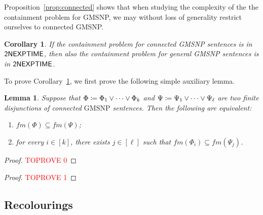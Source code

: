 \documentclass[oneside,reqno,12pt]{amsart}
\theoremstyle{plain}
\newtheorem{lemma}[thm]{Lemma}
\newtheorem{corollary}[thm]{Corollary}
\theoremstyle{remark}
\renewcommand{\coloneqq}{\mathrel{\mathop:}\mathrel{\mkern-1.2mu}=}
\newcommand{\fm}{\ensuremath{\mathit{fm}}\xspace}
\newcommand{\GMSNP}{\ensuremath{\mathrm{GMSNP}}\xspace}
\newcommand{\TWONEXPTIME}{{\textup{\textsf{2NEXPTIME}}}\xspace}
\begin{document}
{Proposition~\ref{prop:connected} shows that when studying the complexity of the the containment problem for GMSNP,   we may without loss of generality restrict ourselves to connected GMSNP.  


\begin{corollary}\label{cor:connected_matters_not}
    If the containment problem for connected GMSNP sentences is in $\TWONEXPTIME$, then also the containment problem for general GMSNP sentences is in $\TWONEXPTIME$.
\end{corollary}


To prove Corollary~\ref{cor:connected_matters_not}, we first prove the following simple auxiliary lemma.

\begin{lemma}\label{lem:connected}
 Suppose that $\Phi\coloneqq\Phi_1\vee\dots\vee\Phi_k$ and $\Psi\coloneqq\Psi_1\vee\dots\vee\Psi_\ell$ are two finite disjunctions of connected $\GMSNP$ sentences. 
Then the following are equivalent:
\begin{enumerate}
     \item \label{item:disj1} $\fm(\Phi)\subseteq \fm(\Psi)$;
     \item \label{item:disj2}  for every $i\in[k]$, there exists $j\in[\ell]$ such that $\fm(\Phi_i)\subseteq \fm(\Psi_j)$. 
 \end{enumerate} 
\end{lemma}   
  

\begin{proof}\textcolor{red}{TOPROVE 0}\end{proof}
 
\begin{proof}\textcolor{red}{TOPROVE 1}\end{proof}




\subsection{Recolourings} \label{section:recolourings}

}
\end{document}

